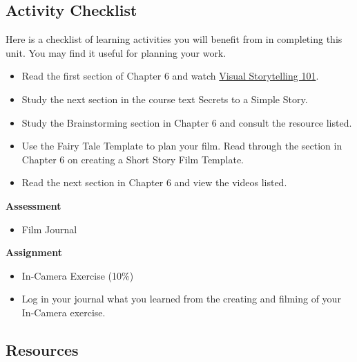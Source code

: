 \documentclass[
]{book}
\providecommand{\tightlist}{%
  \setlength{\itemsep}{0pt}\setlength{\parskip}{0pt}}
\begin{document}
\hypertarget{activity-checklist-5}{%
\subsection*{Activity Checklist}\label{activity-checklist-5}}

\begin{reflect}
Here is a checklist of learning activities you will benefit from in completing this unit. You may find it useful for planning your work.

\begin{itemize}
\tightlist
\item
  Read the first section of Chapter 6 and watch \href{https://www.youtube.com/watch?v=iWQQgZh9EyE}{Visual Storytelling 101}.\\
\item
  Study the next section in the course text Secrets to a Simple Story.\\
\item
  Study the Brainstorming section in Chapter 6 and consult the resource listed.\\
\item
  Use the Fairy Tale Template to plan your film. Read through the section in Chapter 6 on creating a Short Story Film Template.\\
\item
  Read the next section in Chapter 6 and view the videos listed.
\end{itemize}

\textbf{Assessment}

\begin{itemize}
\tightlist
\item
  Film Journal
\end{itemize}

\textbf{Assignment}

\begin{itemize}
\item
  In-Camera Exercise (10\%)
\item
  Log in your journal what you learned from the creating and filming of your In-Camera exercise.
\end{itemize}
\end{reflect}

\hypertarget{resources-5}{%
\subsection*{Resources}\label{resources-5}}
\end{document}
